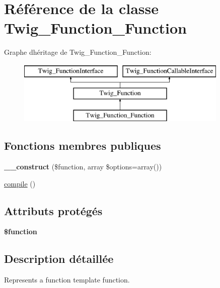 \hypertarget{class_twig___function___function}{}\section{Référence de la classe Twig\+\_\+\+Function\+\_\+\+Function}
\label{class_twig___function___function}
Graphe d\textquotesingle{}héritage de Twig\+\_\+\+Function\+\_\+\+Function\+:\begin{figure}[H]
\begin{center}
\leavevmode
\includegraphics[height=3.000000cm]{class_twig___function___function}
\end{center}
\end{figure}
\subsection*{Fonctions membres publiques}
\begin{DoxyCompactItemize}
\item 
{\bfseries \+\_\+\+\_\+construct} (\$function, array \$options=array())\hypertarget{class_twig___function___function_ae6ad9907bb7237c92e880ca6bfd16469}{}\label{class_twig___function___function_ae6ad9907bb7237c92e880ca6bfd16469}

\item 
\hyperlink{class_twig___function___function_a3815e7c2e73f00c2ebffcf5b90eef3b1}{compile} ()
\end{DoxyCompactItemize}
\subsection*{Attributs protégés}
\begin{DoxyCompactItemize}
\item 
{\bfseries \$function}\hypertarget{class_twig___function___function_af3e5d0d1ff43879d493dd97bb760c479}{}\label{class_twig___function___function_af3e5d0d1ff43879d493dd97bb760c479}

\end{DoxyCompactItemize}


\subsection{Description détaillée}
Represents a function template function.

